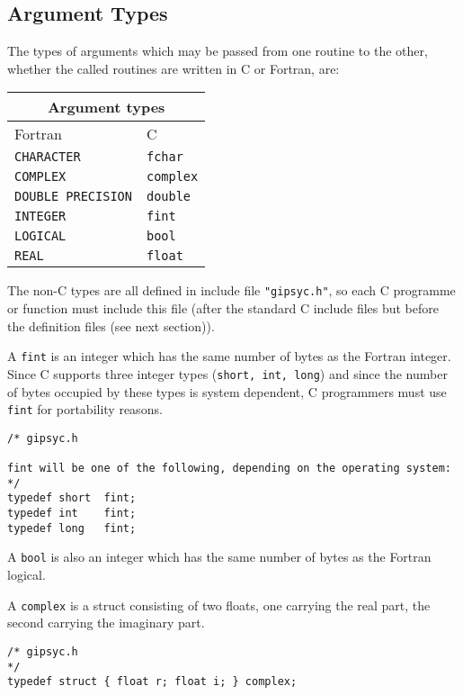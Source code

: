 \subsection{Argument Types}

The types of arguments which may be passed from one routine to the
other, whether the called routines are written in C or Fortran, are:

\begin{center}
\begin{tabular}{|l|l|}
\hline
\multicolumn{2}{|c|}{Argument types}\\
\hline
Fortran&C\\
\hline
{\tt CHARACTER       }&{\tt fchar  }\\
{\tt COMPLEX         }&{\tt complex}\\
{\tt DOUBLE PRECISION}&{\tt double }\\
{\tt INTEGER         }&{\tt fint   }\\
{\tt LOGICAL         }&{\tt bool   }\\
{\tt REAL            }&{\tt float  }\\
\hline
\end{tabular}
\end{center}

The non-C types are all defined in include file {\tt "gipsyc.h"}, so
each C programme or function must include this file (after the standard
C include files but before the definition files (see next section)). 

A {\tt fint} is an integer which has the same number of bytes as the
Fortran integer.  Since C supports three integer types ({\tt short, int,
long}) and since the number of bytes occupied by these types is system
dependent, C programmers must use {\tt fint} for portability reasons. 

\begin{verbatim}
/* gipsyc.h

fint will be one of the following, depending on the operating system:
*/
typedef short  fint;    
typedef int    fint;
typedef long   fint;
\end{verbatim}

A {\tt bool} is also an integer which has the same number of bytes as
the Fortran logical.

A {\tt complex} is a struct consisting of two floats, one carrying the
real part, the second carrying the imaginary part. 

\begin{verbatim}
/* gipsyc.h
*/
typedef struct { float r; float i; } complex;
\end{verbatim}

